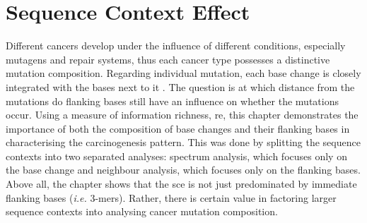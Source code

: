 \chapter{Sequence Context Effect}\label{sce}

Different cancers develop under the influence of different conditions, especially mutagens and repair systems, thus each cancer type possesses a distinctive mutation composition. Regarding individual mutation, each base change is closely integrated with the bases next to it \citep{Zhu2017,Zhu2020,Vinson2012CGMethylation}. The question is at which distance from the mutations do flanking bases still have an influence on whether the mutations occur. Using a measure of information richness, \gls{re}, this chapter demonstrates the importance of both the composition of base changes and their flanking bases in characterising the carcinogenesis pattern. This was done by splitting the sequence contexts into two separated analyses: spectrum analysis, which focuses only on the base change and neighbour analysis, which focuses only on the flanking bases. Above all, the chapter shows that the \gls{sce} is not just predominated by immediate flanking bases (\textit{i.e.} 3-mers). Rather, there is certain value in factoring larger sequence contexts into analysing cancer mutation composition.

